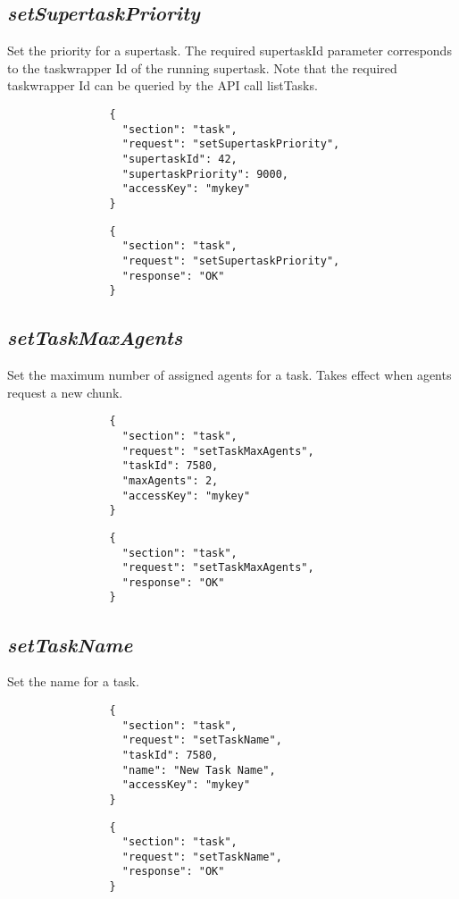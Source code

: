 		\subsection*{\textit{setSupertaskPriority}}
			Set the priority for a supertask.
			The required supertaskId parameter corresponds to the taskwrapper Id of the running supertask.
			Note that the required taskwrapper Id can be queried by the API call listTasks.
			{
				\color{blue}
				\begin{verbatim}
				{
				  "section": "task",
				  "request": "setSupertaskPriority",
				  "supertaskId": 42,
				  "supertaskPriority": 9000,
				  "accessKey": "mykey"
				}
				\end{verbatim}
			}
			{
				\color{OliveGreen}
				\begin{verbatim}
				{
				  "section": "task",
				  "request": "setSupertaskPriority",
				  "response": "OK"
				}
				\end{verbatim}
			}
		\subsection*{\textit{setTaskMaxAgents}}
			Set the maximum number of assigned agents for a task. Takes effect when agents request a new chunk.
			{
				\color{blue}
				\begin{verbatim}
				{
				  "section": "task",
				  "request": "setTaskMaxAgents",
				  "taskId": 7580,
				  "maxAgents": 2,
				  "accessKey": "mykey"
				}
				\end{verbatim}
			}
			{
				\color{OliveGreen}
				\begin{verbatim}
				{
				  "section": "task",
				  "request": "setTaskMaxAgents",
				  "response": "OK"
				}
				\end{verbatim}
			}
		\subsection*{\textit{setTaskName}}
			Set the name for a task.
			{
				\color{blue}
				\begin{verbatim}
				{
				  "section": "task",
				  "request": "setTaskName",
				  "taskId": 7580,
				  "name": "New Task Name",
				  "accessKey": "mykey"
				}
				\end{verbatim}
			}
			{
				\color{OliveGreen}
				\begin{verbatim}
				{
				  "section": "task",
				  "request": "setTaskName",
				  "response": "OK"
				}
				\end{verbatim}
			}
